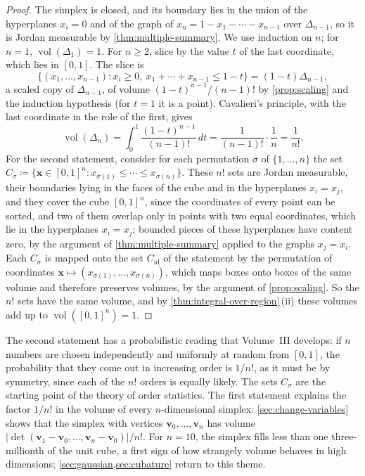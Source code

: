 \begin{proof}
The simplex is closed, and its boundary lies in the union of the hyperplanes $x_i=0$ and of the graph of $x_n=1-x_1-\cdots-x_{n-1}$ over $\Delta_{n-1}$, so it is Jordan measurable by \cref{thm:multiple-summary}. We use induction on $n$; for $n=1$, $\operatorname{vol}(\Delta_1)=1$. For $n\ge2$, slice by the value $t$ of the last coordinate, which lies in $[0,1]$. The slice is
\[
\{(x_1,\ldots,x_{n-1}): x_i\ge0,\ x_1+\cdots+x_{n-1}\le1-t\}=(1-t)\Delta_{n-1},
\]
a scaled copy of $\Delta_{n-1}$, of volume $(1-t)^{n-1}/(n-1)!$ by \cref{prop:scaling} and the induction hypothesis (for $t=1$ it is a point). Cavalieri's principle, with the last coordinate in the role of the first, gives
\[
\operatorname{vol}(\Delta_n)=\int_0^1\frac{(1-t)^{n-1}}{(n-1)!}\,dt=\frac1{(n-1)!}\cdot\frac1n=\frac1{n!} .
\]
For the second statement, consider for each permutation $\sigma$ of $\{1,\ldots,n\}$ the set $C_\sigma\coloneqq\{\mathbf x\in[0,1]^n: x_{\sigma(1)}\le\cdots\le x_{\sigma(n)}\}$. These $n!$ sets are Jordan measurable, their boundaries lying in the faces of the cube and in the hyperplanes $x_i=x_j$, and they cover the cube $[0,1]^n$, since the coordinates of every point can be sorted, and two of them overlap only in points with two equal coordinates, which lie in the hyperplanes $x_i=x_j$; bounded pieces of these hyperplanes have content zero, by the argument of \cref{thm:multiple-summary} applied to the graphs $x_j=x_i$. Each $C_\sigma$ is mapped onto the set $C_{\mathrm{id}}$ of the statement by the permutation of coordinates $\mathbf x\mapsto(x_{\sigma(1)},\ldots,x_{\sigma(n)})$, which maps boxes onto boxes of the same volume and therefore preserves volumes, by the argument of \cref{prop:scaling}. So the $n!$ sets have the same volume, and by \cref{thm:integral-over-region}\,(ii) these volumes add up to $\operatorname{vol}([0,1]^n)=1$.
\end{proof}

The second statement has a probabilistic reading that Volume~III develops: if $n$ numbers are chosen independently and uniformly at random from $[0,1]$, the probability that they come out in increasing order is $1/n!$, as it must be by symmetry, since each of the $n!$ orders is equally likely. The sets $C_\sigma$ are the starting point of the theory of order statistics. The first statement explains the factor $1/n!$ in the volume of every $n$-dimensional simplex: \cref{sec:change-variables} shows that the simplex with vertices $\mathbf v_0,\ldots,\mathbf v_n$ has volume $|\det(\mathbf v_1-\mathbf v_0,\ldots,\mathbf v_n-\mathbf v_0)|/n!$. For $n=10$, the simplex fills less than one three-millionth of the unit cube, a first sign of how strangely volume behaves in high dimensions; \cref{sec:gaussian,sec:cubature} return to this theme.

